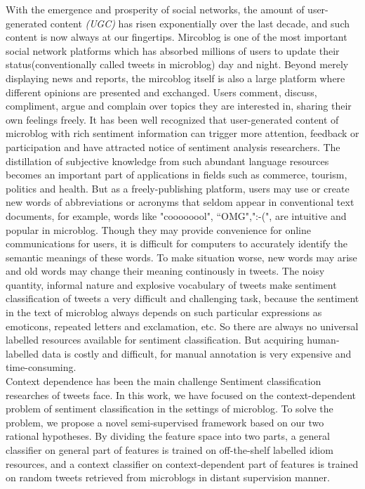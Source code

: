 \documentclass{llncs}
\begin{document}
With the emergence and prosperity of social networks, the amount of user-generated content \emph{(UGC)} has risen exponentially over the last decade, and such content is now always at our fingertips.
Mircoblog is one of the most important social network platforms which has absorbed millions of users to update their status(conventionally called tweets in microblog) day and night.
Beyond merely displaying news and reports, the mircoblog itself is also a large platform where different opinions are presented and exchanged. 
Users comment, discuss, compliment, argue and complain over topics they are interested in, sharing their own feelings freely. 
It has been well recognized that user-generated content of microblog with rich sentiment information can trigger more attention, feedback or participation and have attracted notice of sentiment analysis researchers\cite{DBLP:conf/hicss/StieglitzD12}.
The distillation of subjective knowledge from such abundant language resources becomes an important part of applications in fields such as commerce, tourism, politics and health. 
But as a freely-publishing platform, users may use or create new words of abbreviations or acronyms that seldom appear in conventional text documents, for example, words like "coooooool", “OMG",":-(", are intuitive and popular in microblog.
Though they may provide convenience for online communications for users, it is difficult for computers to accurately identify the semantic meanings of these words. 
To make situation worse, new words may arise and old words may change their meaning continously in tweets.
The noisy quantity, informal nature and explosive vocabulary of tweets make sentiment classification of tweets a very difficult and challenging task, because the sentiment in the text of microblog always depends on such particular expressions as emoticons, repeated letters and exclamation, etc. 
So there are always no universal labelled resources available for sentiment classification. 
But acquiring human-labelled data is costly and difficult, for manual annotation is very expensive and time-consuming.\\
Context dependence has been the main challenge Sentiment classification researches of tweets face.
In this work, we have focused on the context-dependent problem of sentiment classification in the settings of microblog. To solve the problem, we propose a novel semi-supervised framework based on our two rational hypotheses.
By dividing the feature space into two parts, a general classifier on general part of features is trained on off-the-shelf labelled idiom resources, and a context classifier on context-dependent part of features is trained on random tweets retrieved from microblogs in distant supervision manner. 
\end{document}
